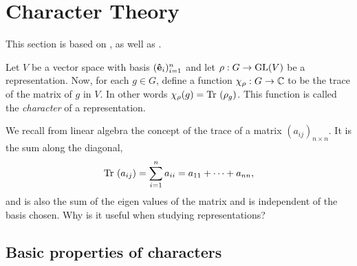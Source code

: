\clearpage{\thispagestyle{empty}}
\section{Character Theory}

This section is based on \cite[Ch.2.]{Serre}, as well as \cite[Sect.2.2.]{FultonHarris}.

Let $V$ be a vector space with basis $(\mathbf{\hat{e}}_i)_{i=1}^n$ and let $\rho: G \rightarrow \text{GL}(V)$ be a representation. Now, for each $g \in G$, define a function $\chi_{\rho}: G \rightarrow \mathbb{C}$ to be the trace of the matrix of $g$ in $V$. In other words $\chi_{\rho}(g) = \text{Tr }(\rho_g)$. This function is called the \emph{character} of a representation.

We recall from linear algebra the concept of the trace of a matrix $(a_{ij})_{n \times n}$. It is the sum along the diagonal,
\begin{align*}
	\text{Tr }(a_{ij})= \sum_{i=1}^{n} a_{ii} = a_{11} + \dots + a_{nn},
\end{align*}
and is also the sum of the eigen values of the matrix and is independent of the basis chosen. Why is it useful when studying representations?

\subsection{Basic properties of characters}

